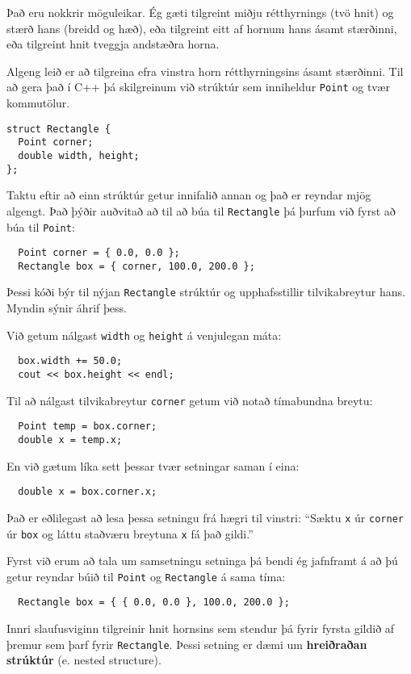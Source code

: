 Það eru nokkrir möguleikar.
Ég gæti tilgreint miðju rétthyrnings (tvö hnit) og stærð hans (breidd og hæð), eða tilgreint eitt af hornum hans ásamt stærðinni, eða tilgreint hnit tveggja andstæðra horna.

Algeng leið er að tilgreina efra vinstra horn rétthyrningsins ásamt stærðinni.
Til að gera það í C++ þá skilgreinum við strúktúr sem inniheldur {\tt Point} og tvær kommutölur.

\begin{verbatim}
struct Rectangle {
  Point corner;
  double width, height;
};  
\end{verbatim}
%
Taktu eftir að einn strúktúr getur innifalið annan og það er reyndar mjög algengt.
Það þýðir auðvitað að til að búa til {\tt Rectangle} þá þurfum við fyrst að búa til {\tt Point}:

\begin{verbatim}
  Point corner = { 0.0, 0.0 };
  Rectangle box = { corner, 100.0, 200.0 };
\end{verbatim}
%
Þessi kóði býr til nýjan {\tt Rectangle} strúktúr og upphafsstillir tilvikabreytur hans.
Myndin sýnir áhrif þess.

\vspace{0.1in}
\centerline{}
\vspace{0.1in}
%
Við getum nálgast {\tt width} og {\tt height} á venjulegan máta:

\begin{verbatim}
  box.width += 50.0;
  cout << box.height << endl;
\end{verbatim}
%
Til að nálgast tilvikabreytur {\tt corner} getum við notað tímabundna breytu:

\begin{verbatim}
  Point temp = box.corner;
  double x = temp.x;
\end{verbatim}
%
En við gætum líka sett þessar tvær setningar saman í eina:


\begin{verbatim}
  double x = box.corner.x;
\end{verbatim}
%
Það er eðlilegast að lesa þessa setningu frá hægri til vinstri: 
``Sæktu {\tt x} úr {\tt corner} úr {\tt box} og láttu staðværu breytuna {\tt x} fá það gildi.''

Fyrst við erum að tala um samsetningu setninga þá bendi ég jafnframt á að þú getur reyndar búið til {\tt Point} og {\tt Rectangle} á sama tíma:

\begin{verbatim}
  Rectangle box = { { 0.0, 0.0 }, 100.0, 200.0 };
\end{verbatim}
%
Innri slaufusviginn tilgreinir hnit hornsins sem stendur þá fyrir fyrsta gildið af þremur sem þarf fyrir {\tt Rectangle}.
Þessi setning er dæmi um {\bf hreiðraðan strúktúr} (e. nested structure).


